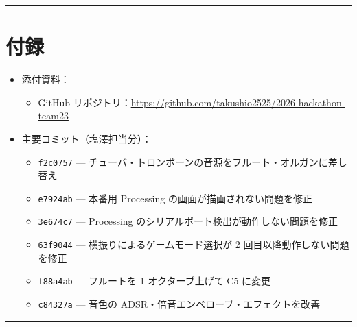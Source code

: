 \documentclass[uplatex,dvipdfmx,a4paper,11pt]{jsarticle}
\newcommand{\sectionrule}{\par\medskip\noindent\rule{\linewidth}{0.6pt}\par\medskip}
\begin{document}
\sectionrule

\section{付録}

\begin{itemize}
  \item 添付資料：
    \begin{itemize}
      \item GitHub リポジトリ：\url{https://github.com/takushio2525/2026-hackathon-team23}
    \end{itemize}
  \item 主要コミット（塩澤担当分）：
    \begin{itemize}
      \item \texttt{f2c0757} --- チューバ・トロンボーンの音源をフルート・オルガンに差し替え
      \item \texttt{e7924ab} --- 本番用 Processing の画面が描画されない問題を修正
      \item \texttt{3e674c7} --- Processing のシリアルポート検出が動作しない問題を修正
      \item \texttt{63f9044} --- 横振りによるゲームモード選択が 2 回目以降動作しない問題を修正
      \item \texttt{f88a4ab} --- フルートを 1 オクターブ上げて C5 に変更
      \item \texttt{c84327a} --- 音色の ADSR・倍音エンベロープ・エフェクトを改善
    \end{itemize}
\end{itemize}

\sectionrule
\end{document}
